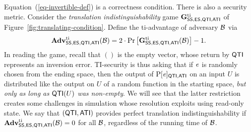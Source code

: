 Equation~(\ref{eq-invertible-def}) is a correctness condition. There is also a security metric. Consider the \textit{translation indistinguishability} game  $\mathbf{G}^{\mathrm{ti}}_{\mathsf{SS},\mathsf{ES},\mathsf{QTI},\mathsf{ATI}}$ of Figure~\ref{fig:translating-condition}. Define the ti-advantage of adversary $\mathcal{B}$ via
\[
\mathbf{Adv}^{\mathrm{ti}}_{\mathsf{SS},\mathsf{ES},\mathsf{QTI},\mathsf{ATI}}(\mathcal{B}) =
2 \cdot \Pr\left[ \mathbf{G}^{\mathrm{ti}}_{\mathsf{SS},\mathsf{ES},\mathsf{QTI},\mathsf{ATI}}(\mathcal{B})\right] - 1.
\]
In reading the game, recall that $()$ is the empty vector, whose return by $\mathsf{QTI}$ represents an inversion error. TI-security is thus asking that if $\mathit{e}$ is randomly chosen from the ending space, then the output of $\mathrm{P}[\mathit{e}]_{\mathsf{QTI},\mathsf{ATI}}$ on an input $U$ is distributed like the output on $U$ of a random function in the starting space, \textit{but only as long as $\mathsf{QTI}(U)$ was non-empty}. We will see that the latter restriction creates some challenges in simulation whose resolution exploits using read-only state. We say that $(\mathsf{QTI},\mathsf{ATI})$ provides perfect translation indistinguishability if $\mathbf{Adv}^{\mathrm{ti}}_{\mathsf{SS},\mathsf{ES},\mathsf{QTI},\mathsf{ATI}}(\mathcal{B}) = 0$ for all $\mathcal{B}$, regardless of the running time of $\mathcal{B}$. 

